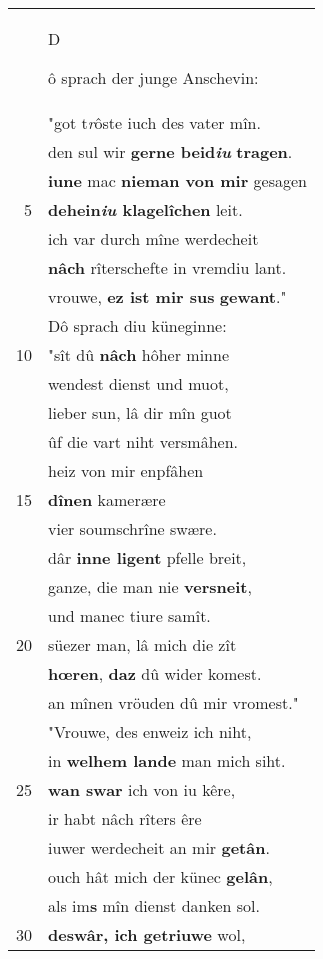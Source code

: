 \documentclass[8pt,a4paper,notitlepage]{article}
\begin{document}
\begin{table}[ht]
\begin{minipage}[t]{0.5\linewidth}
\begin{tabular}{rl}
 & \begin{large}D\end{large}ô sprach der junge Anschevin:\\ 
 & "got t\textit{r}ôste iuch des vater mîn.\\ 
 & den sul wir \textbf{gerne beid\textit{iu}} \textbf{tragen}.\\ 
 & \textbf{iu}\textbf{ne} mac \textbf{nieman von mir} gesagen\\ 
5 & \textbf{dehein\textit{iu} klagelîchen} leit.\\ 
 & ich var durch mîne werdecheit\\ 
 & \textbf{nâch} rîterschefte in vremdiu lant.\\ 
 & vrouwe, \textbf{ez ist mir sus} \textbf{gewant}."\\ 
 & Dô sprach diu küneginne:\\ 
10 & "sît dû \textbf{nâch} hôher minne\\ 
 & wendest dienst und muot,\\ 
 & lieber sun, lâ dir mîn guot\\ 
 & ûf die vart niht versmâhen.\\ 
 & heiz von mir enpfâhen\\ 
15 & \textbf{dînen} kamerære\\ 
 & vier soumschrîne swære.\\ 
 & dâr \textbf{inne ligent} pfelle breit,\\ 
 & ganze, die man nie \textbf{versneit},\\ 
 & und manec tiure samît.\\ 
20 & süezer man, lâ mich die zît\\ 
 & \textbf{hœren}, \textbf{daz} dû wider komest.\\ 
 & an mînen vröuden dû mir vromest."\\ 
 & "Vrouwe, des enweiz ich niht,\\ 
 & in \textbf{welhem lande} man mich siht.\\ 
25 & \textbf{wan swar} ich von iu kêre,\\ 
 & ir habt nâch rîters êre\\ 
 & iuwer werdecheit an mir \textbf{getân}.\\ 
 & ouch hât mich der künec \textbf{gelân},\\ 
 & als im\textbf{s} mîn dienst danken sol.\\ 
30 & \textbf{deswâr, ich getriuwe} wol,\\ 
\end{tabular}

\end{minipage}
\end{table}
\end{document}
